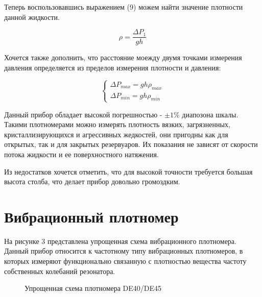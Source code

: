 \documentclass[russian, utf8]{eskdtext}
\begin{document}
Теперь воспользовавшись выражением (9) можем найти значение плотности данной жидкости.

\begin{equation}
	\rho = \frac{\Delta P_1}{gh}
\end{equation}

Хочется также дополнить, что расстояние моежду двумя точками измерения давления определяется из пределов измерения плотности и давления: 

\begin{equation}
	\begin{cases}
		\Delta P_{max} = gh \rho_{max} \\
		\Delta P_{min} = gh \rho_{min}
	\end{cases}
\end{equation}

Данный прибор обладает высокой погрешностью - $\pm 1$\% диапозона шкалы. Такими плотномерами можно измерять плотность вязких, загрязненных, кристаллизирующихся и агрессивных жедкостей, они пригодны как для открытых, так и для закрытых резервуаров. Их показания не зависят от скорости потока жидкости и ее поверхностного натяжения. \par

Из недостатков хочется отметить, что для высокой точности требуется большая высота столба, что делает прибор довольно громоздким.

\newpage

\section{Вибрационный плотномер}

На рисунке 3 представлена упрощенная схема вибрационного плотномера. Данный прибор относится к частотному типу вибрационных плотномеров, в которых измеряют функционально связанную с плотностью вещества частоту собственных колебаний резонатора.
\begin{figure}[h!]
	\centering
	\caption{Упрощенная схема плотномера DE40/DE45}
\end{figure}
\end{document}
